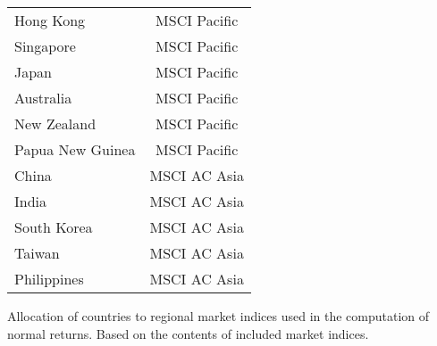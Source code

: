 \documentclass[12pt]{article}
\begin{document}
\begin{table}
{\begin{tabular}{lc}
            
            Hong Kong & MSCI Pacific  \\
            Singapore & MSCI Pacific  \\
            Japan & MSCI Pacific  \\
            Australia & MSCI Pacific  \\
            New Zealand & MSCI Pacific  \\
            Papua New Guinea & MSCI Pacific  \\
            
            China & MSCI AC Asia  \\
            India & MSCI AC Asia  \\
            South Korea & MSCI AC Asia  \\
            Taiwan & MSCI AC Asia  \\
            Philippines & MSCI AC Asia  \\
            \bottomrule
        
        \end{tabular}
        
    \vspace{0.1cm}

    \begin{tablenotes}
        \footnotesize
        \item Allocation of countries to regional market indices used in the computation of normal returns. Based on the contents of included market indices.
    \end{tablenotes}
    }

\end{table}

\end{document}
